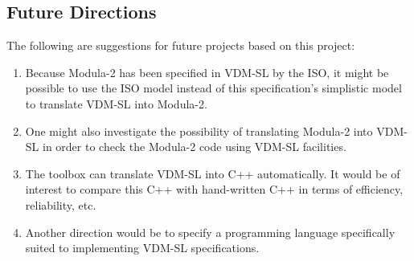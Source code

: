 \documentclass[11pt]{article}
\begin{document}
\subsection{Future Directions}
The following are suggestions for future projects based on this project:
\begin{enumerate}
\item Because Modula-2 has been specified in VDM-SL by the ISO, it might be possible to use the ISO model instead of this specification's simplistic model to translate VDM-SL into Modula-2.
\item One might also investigate the possibility of translating Modula-2 into VDM-SL in order to check the Modula-2 code using VDM-SL facilities.
\item The toolbox can translate VDM-SL into C++ automatically.  It would be of interest to compare this C++ with hand-written C++ in terms of efficiency, reliability, etc.
\item Another direction would be to specify a programming language specifically suited to implementing VDM-SL specifications.
\end{enumerate}
\end{document}
